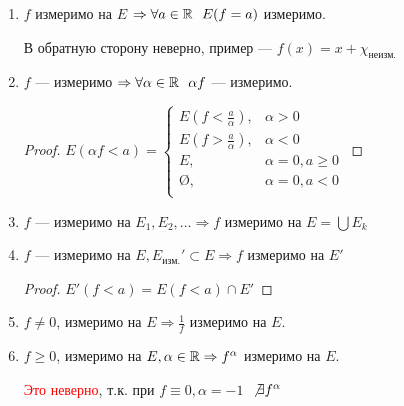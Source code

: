 \begin{prop}\itemfix
    \begin{enumerate}
        \item \(f\) измеримо на \(E\) \( \Rightarrow \forall a\in\mathbb{R} \ \ E(f = a)\) измеримо.

              В обратную сторону неверно, пример --- \(f(x) = x + \chi_\text{неизм.}\)

        \item \(f\) --- измеримо \( \Rightarrow \forall \alpha\in\R \ \ \alpha f\) --- измеримо.

              \begin{proof}
                  \(E(\alpha f < a) = \begin{cases}
                      E(f < \frac{a}{\alpha}), & \alpha > 0           \\
                      E(f > \frac{a}{\alpha}), & \alpha < 0           \\
                      E,                       & \alpha = 0, a \geq 0 \\
                      \text{\O},               & \alpha = 0, a < 0    \\
                  \end{cases}\)
              \end{proof}
        \item \(f\) --- измеримо на \(E_1, E_2, \dots \Rightarrow f\) измеримо на \(E = \bigcup E_k\)
        \item \(f\) --- измеримо на \(E, E_{\text{изм.}}'\subset E \Rightarrow f\) измеримо на \(E'\)
              \begin{proof}
                  \(E'(f < a) = E(f < a)\cap E'\)
              \end{proof}
        \item \(f \neq 0\), измеримо на \(E \Rightarrow \frac{1}{f}\) измеримо на \(E\).
        \item \(f \geq 0\), измеримо на \(E, \alpha\in\mathbb{R} \Rightarrow f^\alpha\) измеримо на \(E\).

              \textcolor{red}{Это неверно}, т.к. при \(f \equiv 0, \alpha = - 1\) \(\ \not\exists f^\alpha\)
    \end{enumerate}
\end{prop}

